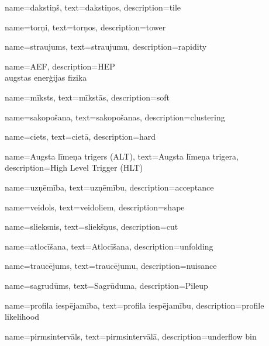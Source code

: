 {
        name=dakstiņš,
        text=dakstiņos,
        description={tile}
}


{
        name=torņi,
        text=torņos,
        description={tower}
}


{
        name=straujums,
        text=straujumu,
        description={rapidity}
}

{
        name=AEF,
        description={HEP\\
        augstas enerģijas fizika}
}

{
        name=mīksts,
        text=mīkstās,
        description={soft}
}

{
        name=sakopošana,
        text=sakopošanas,
        description={clustering}
}

{
        name=ciets,
        text=cietā,
        description={hard}
}

{
        name=Augsta līmeņa trigers (ALT),
        text=Augsta līmeņa trigera,
        description={High Level Trigger (HLT)}
}


{
        name=uzņēmība,
        text=uzņēmību,
        description={acceptance}
}

{
        name=veidols,
        text=veidoliem,
        description={shape}
}

{
        name=slieksnis,
        text=sliekšņus,
        description={cut}
}

{
        name=atlocīšana,
        text=Atlocīšana,
        description={unfolding}
}

{
        name=traucējums,
        text=traucējumu,
        description={nuisance}
}

{
        name=sagrudūms,
        text=Sagrūduma,
        description={Pileup}
}

{
        name=profila iespējamība,
        text=profila iespējamību,
        description={profile likelihood}
}

{
        name=pirmsintervāls,
        text=pirmsintervālā,
        description={underflow bin}
}
